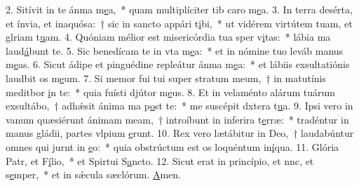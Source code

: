 2. Sitívit in te ánma m\uline{e}a,~* quam multiplíciter tib caro m\uline{e}a.
3. In terra desérta, et ínvia, et inaquósa:~† sic in sancto appári t\uline{i}bi,~* ut vidérem virtútem tuam, et glriam t\uline{u}am.
4. Quóniam mélior est misericórdia tua sper v\uline{i}tas:~* lábia ma laud\uline{á}bunt te.
5. Sic benedícam te in vta m\uline{e}a:~* et in nómine tuo leváb manus m\uline{e}as.
6. Sicut ádipe et pinguédine repleátur ánma m\uline{e}a:~* et lábiis exsultatiónis laudbit os m\uline{e}um.
7. Si memor fui tui super stratum meum,~† in matutínis meditbor \uline{i}n te:~* quia fuísti djútor m\uline{e}us.
8. Et in velaménto alárum tuárum exsultábo,~† adhǽsit ánima ma p\uline{o}st te:~* me suscépit dxtera t\uline{u}a.
9. Ipsi vero in vanum quæsiérunt ánimam meam,~† introíbunt in inferira t\uline{e}rræ:~* tradéntur in manus gládii, partes vlpium \uline{e}runt.
10. Rex vero lætábitur in Deo,~† laudabúntur omnes qui jurnt in \uline{e}o:~* quia obstrúctum est os loquéntum in\uline{í}qua.
11. Glória Patr, et F\uline{í}lio,~* et Spirtui S\uline{a}ncto.
12. Sicut erat in princípio, et nnc, et s\uline{e}mper,~* et in sǽcula sæclórum. \uline{A}men.
